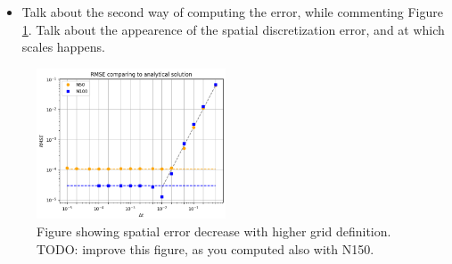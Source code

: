 \documentclass[
  english,        %
  font=times,     %
  onecolumn,      %
]{tumarticle}
\begin{document}
\begin{itemize}
    \item Talk about the second way of computing the error, while commenting Figure \ref{fig:RMSE}. Talk about the appearence of the spatial discretization error, and at which scales happens.
\end{itemize}

\begin{figure}[!ht]
    \centering
    \includegraphics[width=0.5\textwidth]{resources/RMSE_study.png}
    \caption{Figure showing spatial error decrease with higher grid definition. TODO: improve this figure, as you computed also with N150.}
    \label{fig:RMSE}
\end{figure}
\end{document}
